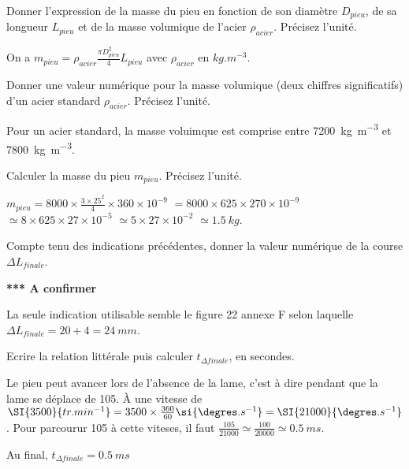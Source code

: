 \documentclass[11pt]{article}
\begin{document}
\UPSTIquestion* Donner l'expression de la masse du pieu en fonction de son diamètre $D_{pieu}$, de sa longueur $L_{pieu}$ et de la masse volumique de l'acier $\rho_{acier}$. Précisez l'unité. 

\begin{UPSTIcorrige}
On a  $m_{pieu} = \rho_{acier} \frac{\pi D^2_{pieu}}{4} L_{pieu}$ avec $\rho_{acier}$ en $\si{kg.m^{-3}}$. 
\end{UPSTIcorrige}

\UPSTIquestion Donner une valeur numérique pour la masse volumique (deux chiffres significatifs) d'un acier standard $\rho_{acier}$. Précisez l'unité. 

\begin{UPSTIcorrige}
Pour un acier standard, la masse voluimque est comprise entre \SI{7200}{kg.m^{-3}} et \SI{7800}{kg.m^{-3}}.
\end{UPSTIcorrige}

\UPSTIquestion Calculer la masse du pieu $m_{pieu}$. Précisez l'unité. 

\begin{UPSTIcorrige}
$m_{pieu} = 8000 \times \frac{3\times 25^2}{4} \times 360 \times 10^{-9}$
$= 8000 \times 625\times 270 \times 10^{-9}$
$\simeq 8 \times625\times 27 \times 10^{-5}$
$\simeq 5\times 27 \times 10^{-2}$
$\simeq \SI{1,5}{kg}$.


\end{UPSTIcorrige}


\UPSTIquestion Compte tenu des indications précédentes, donner la valeur numérique de la course $\Delta L_{finale}$. 

\begin{UPSTIcorrige}

\textbf{*** A confirmer} 

La seule indication utilisable semble le figure 22 annexe F selon laquelle  $\Delta L_{finale} = 20 + 4 = \SI{24}{mm}$.

\end{UPSTIcorrige}

\UPSTIquestion Ecrire la relation littérale puis calculer $t_{\Delta finale}$, en secondes.
\begin{UPSTIcorrige}
Le pieu peut avancer lors de l'absence de la lame, c'est à dire pendant que la lame se déplace de \SI{105}{\degres}. 
À une vitesse de $\SI{3500}{tr.min^{-1}} = 3500\times \frac{360}{60} \si{\degres.s^{-1}} =   \SI{21000}{\degres.s^{-1}}$. Pour parcourur \SI{105}{\degres} à cette viteses, il faut $\frac{105}{21000} \simeq \frac{100}{20000} \simeq \SI{0,5}{ms}$. 

Au final, $t_{\Delta finale} = \SI{0,5}{ms} $
\end{UPSTIcorrige}
\end{document}
